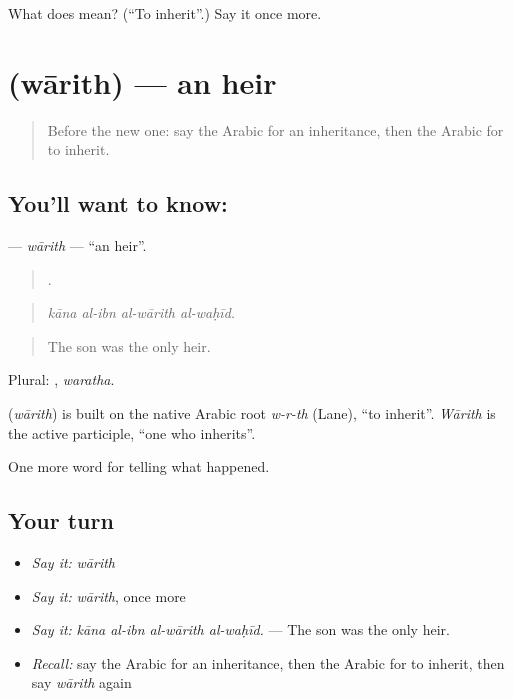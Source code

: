 \begin{tcolorbox}[breakable,colback=teal!4,colframe=teal!35!black,title={Before you move on}]
What does  mean? (\textquotedblleft{}To inherit\textquotedblright{}.) Say it once more.
\end{tcolorbox}
\section[\texorpdfstring{\ar{وارث} (wārith)}{وارث (wārith)}]{ (wārith) — an heir}

\label{lesson:AR-C337-warith}



\begin{quote}
Before the new one: say the Arabic for an inheritance, then the Arabic for to inherit.
\end{quote}

\subsection*{You'll want to know: }
\textbf{} — \emph{wārith} — \textquotedblleft{}an heir\textquotedblright{}.

\begin{quote}
   .
\end{quote}

\begin{quote}
\emph{kāna al-ibn al-wārith al-waḥīd.}
\end{quote}

\begin{quote}
The son was the only heir.
\end{quote}

Plural: , \emph{waratha}.

\begin{cousinweb}
\textbf{} (\emph{wārith}) is built on the native Arabic root \emph{w-r-th} (Lane), \textquotedblleft{}to inherit\textquotedblright{}. \emph{Wārith} is the active participle, \textquotedblleft{}one who inherits\textquotedblright{}.
\end{cousinweb}

\begin{grammarlens}[title={What you've built}]
One more word for telling what happened.
\end{grammarlens}

\subsection*{Your turn}
\begin{itemize}
\raggedright
  \item \emph{Say it:} \emph{wārith}
  \item \emph{Say it:} \emph{wārith}, once more
  \item \emph{Say it:} \emph{kāna al-ibn al-wārith al-waḥīd.} — The son was the only heir.
  \item \emph{Recall:} say the Arabic for an inheritance, then the Arabic for to inherit, then say \emph{wārith} again
\end{itemize}

